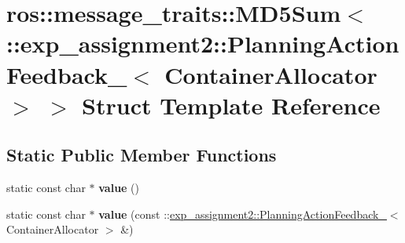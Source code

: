 \hypertarget{structros_1_1message__traits_1_1MD5Sum_3_01_1_1exp__assignment2_1_1PlanningActionFeedback___3_01ContainerAllocator_01_4_01_4}{}\section{ros\+:\+:message\+\_\+traits\+:\+:M\+D5\+Sum$<$ \+:\+:exp\+\_\+assignment2\+:\+:Planning\+Action\+Feedback\+\_\+$<$ Container\+Allocator $>$ $>$ Struct Template Reference}
\label{structros_1_1message__traits_1_1MD5Sum_3_01_1_1exp__assignment2_1_1PlanningActionFeedback___3_01ContainerAllocator_01_4_01_4}
\subsection*{Static Public Member Functions}
\begin{DoxyCompactItemize}
\item 
\mbox{\label{structros_1_1message__traits_1_1MD5Sum_3_01_1_1exp__assignment2_1_1PlanningActionFeedback___3_01ContainerAllocator_01_4_01_4_aa50f9ec4e10153b736673735b627a0e0}} 
static const char $\ast$ {\bfseries value} ()
\item 
\mbox{\label{structros_1_1message__traits_1_1MD5Sum_3_01_1_1exp__assignment2_1_1PlanningActionFeedback___3_01ContainerAllocator_01_4_01_4_a1cfd9fb3bda8750108e929c141050646}} 
static const char $\ast$ {\bfseries value} (const \+::\hyperlink{structexp__assignment2_1_1PlanningActionFeedback__}{exp\+\_\+assignment2\+::\+Planning\+Action\+Feedback\+\_\+}$<$ Container\+Allocator $>$ \&)
\end{DoxyCompactItemize}
